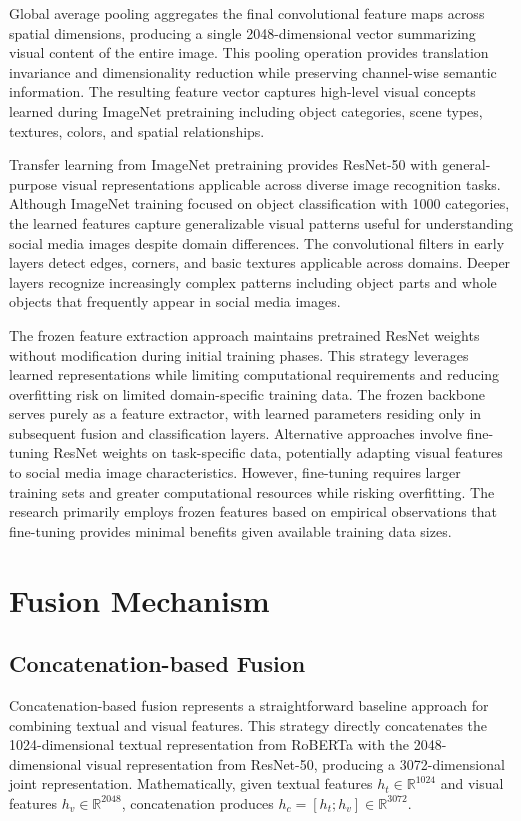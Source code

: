 \documentclass[12pt,a4paper]{report}
\begin{document}
Global average pooling aggregates the final convolutional feature maps across spatial dimensions, producing a single 2048-dimensional vector summarizing visual content of the entire image. This pooling operation provides translation invariance and dimensionality reduction while preserving channel-wise semantic information. The resulting feature vector captures high-level visual concepts learned during ImageNet pretraining including object categories, scene types, textures, colors, and spatial relationships.

Transfer learning from ImageNet pretraining provides ResNet-50 with general-purpose visual representations applicable across diverse image recognition tasks. Although ImageNet training focused on object classification with 1000 categories, the learned features capture generalizable visual patterns useful for understanding social media images despite domain differences. The convolutional filters in early layers detect edges, corners, and basic textures applicable across domains. Deeper layers recognize increasingly complex patterns including object parts and whole objects that frequently appear in social media images.

The frozen feature extraction approach maintains pretrained ResNet weights without modification during initial training phases. This strategy leverages learned representations while limiting computational requirements and reducing overfitting risk on limited domain-specific training data. The frozen backbone serves purely as a feature extractor, with learned parameters residing only in subsequent fusion and classification layers. Alternative approaches involve fine-tuning ResNet weights on task-specific data, potentially adapting visual features to social media image characteristics. However, fine-tuning requires larger training sets and greater computational resources while risking overfitting. The research primarily employs frozen features based on empirical observations that fine-tuning provides minimal benefits given available training data sizes.

\section{Fusion Mechanism}

\subsection{Concatenation-based Fusion}

Concatenation-based fusion represents a straightforward baseline approach for combining textual and visual features. This strategy directly concatenates the 1024-dimensional textual representation from RoBERTa with the 2048-dimensional visual representation from ResNet-50, producing a 3072-dimensional joint representation. Mathematically, given textual features $h_t \in \mathbb{R}^{1024}$ and visual features $h_v \in \mathbb{R}^{2048}$, concatenation produces $h_c = [h_t; h_v] \in \mathbb{R}^{3072}$.
\end{document}
